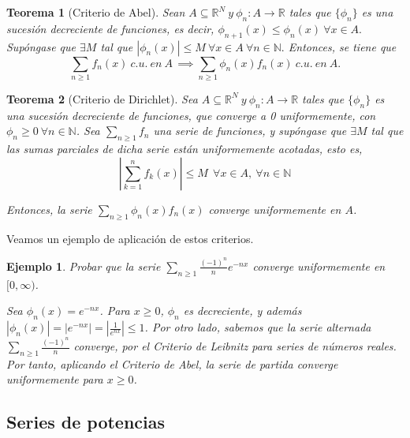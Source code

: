 \documentclass[11pt, a4paper]{article}
\newif\IfInSansMode
\theoremstyle{theorem-style}
\newtheorem{nth}{Teorema}[section]
\theoremstyle{definition-style}
\theoremstyle{remark-style}
\theoremstyle{example-style}
\newtheorem{ejemplo}{Ejemplo}[section]
\begin{document}
\begin{nth}[Criterio de Abel] \label{11} Sean $ A \subseteq \mathbb{R}^N\  y \ \phi_n : A \rightarrow \mathbb{R}$ tales que $\{\phi_n\}$ es una sucesión decreciente de funciones, es decir, $\phi_{n+1}(x) \leq \phi_n (x)\ \forall x \in A.$ Supóngase que $\exists M$ tal que $|\phi_n (x)| \leq M\ \forall x \in A\ \forall n \in \mathbb{N}.$ Entonces, se tiene que
  $$\sum_{n \ge 1} f_n(x)\ c. u.\ en\ A\, \implies \sum_{n \ge 1} \phi_n(x) f_n(x)\ c. u.\ en\ A.$$
\end{nth}

\begin{nth}[Criterio de Dirichlet] \label{12} Sea $A \subseteq \mathbb{R}^N\  y \ \phi_n : A \rightarrow \mathbb{R}$ tales que $\{\phi_n\}$ es una sucesión decreciente de funciones, que converge a 0 uniformemente, con $\phi_n \ge 0 \ \forall n \in \mathbb{N}$. Sea $\sum_{n \ge 1} f_n$ una serie de funciones, y supóngase que $\exists M$ tal que las sumas parciales de dicha serie están uniformemente acotadas, esto es, $$\left| \sum_{k=1}^n f_k(x) \right| \le M \ \ \forall x \in A, \ \forall n \in \mathbb{N}$$ 

  Entonces, la serie $\displaystyle \sum_{n\ge 1} \phi_n(x)f_n(x)$ converge uniformemente en $A$.
  
\end{nth}

Veamos un ejemplo de aplicación de estos criterios.

\begin{ejemplo}
  Probar que la serie $\displaystyle \sum_{n \ge 1} \frac{(-1)^n}{n} e^{-nx}$ converge uniformemente en $[0, \infty)$.
  
  Sea $\phi_n(x) = e^{-nx}$. Para $x \ge 0$, $\phi_n$ es decreciente, y además $|\phi_n(x)| = | e^{-nx} |  = |\frac{1}{e^{nx}} |\le 1$. Por otro lado, sabemos que la serie alternada $ \sum_{n \ge 1} \frac{(-1)^n}{n}$ converge, por el \textit{Criterio de Leibnitz} para series de números reales. Por tanto, aplicando el \textit{Criterio de Abel}, la serie de partida converge uniformemente para $x \ge 0$.  
\end{ejemplo}



\subsection{Series de potencias}
\end{document}
